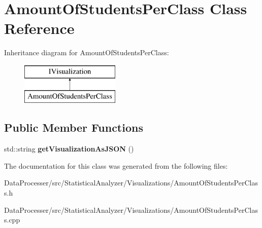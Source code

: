 \hypertarget{classAmountOfStudentsPerClass}{}\section{Amount\+Of\+Students\+Per\+Class Class Reference}
\label{classAmountOfStudentsPerClass}
Inheritance diagram for Amount\+Of\+Students\+Per\+Class\+:\begin{figure}[H]
\begin{center}
\leavevmode
\includegraphics[height=2.000000cm]{classAmountOfStudentsPerClass}
\end{center}
\end{figure}
\subsection*{Public Member Functions}
\begin{DoxyCompactItemize}
\item 
\mbox{\label{classAmountOfStudentsPerClass_a77700a31cecd7c30bcc1637b7f909f78}} 
std\+::string {\bfseries get\+Visualization\+As\+J\+S\+ON} ()
\end{DoxyCompactItemize}


The documentation for this class was generated from the following files\+:\begin{DoxyCompactItemize}
\item 
Data\+Processer/src/\+Statistical\+Analyzer/\+Visualizations/Amount\+Of\+Students\+Per\+Class.\+h\item 
Data\+Processer/src/\+Statistical\+Analyzer/\+Visualizations/Amount\+Of\+Students\+Per\+Class.\+cpp\end{DoxyCompactItemize}
